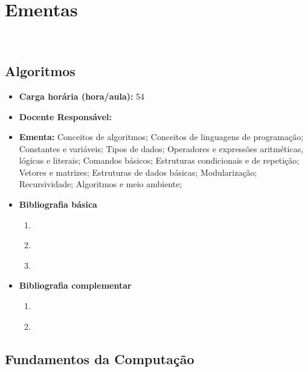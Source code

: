 \documentclass[11pt,fleqn]{book} %
\begin{document}
\chapter{Ementas}\label{ementas}
\vspace{6em}
\begin{flushright}
	\textit{\textcolor{white}{Um bonita citação...}}
\end{flushright}
\vspace{12em}


\newpage
\section{Algoritmos}\label{disc:algoritmos}

\begin{itemize}
	\item \textbf{Carga horária (hora/aula):} 54
	\item \textbf{Docente Responsável:}~
	\item \textbf{Ementa:} 
	Conceitos de algoritmos;
	Conceitos de linguagens de programação;
	Constantes e variáveis;
	Tipos de dados;
	Operadores e expressões aritméticas, lógicas e literais; 
	Comandos básicos;
	Estruturas condicionais e de repetição;
	Vetores e matrizes;
	Estruturas de dados básicas;
	Modularização;
	Recursividade;
	Algoritmos e meio ambiente;
	\item \textbf{Bibliografia básica}
	\begin{enumerate}
		\item \cite{cormen2002algoritmos}
		\item \cite{silva2007estrutura}
		\item \cite{szwarcfiter1994estruturas}
	\end{enumerate}
	\item \textbf{Bibliografia complementar}
	\begin{enumerate}
		\item \cite{ascencio2010estruturas}
		\item \cite{lafore2004estruturas}
	\end{enumerate}	
\end{itemize}



\newpage
\section{Fundamentos da Computação}\label{disc:fundcomp}
\end{document}
